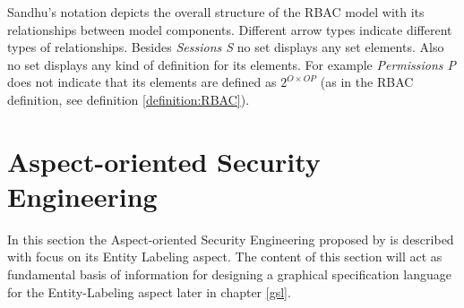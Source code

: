 \documentclass[twoside, openright, 12pt]{book}
\begin{document}
Sandhu's notation depicts the overall structure of the RBAC model with its relationships between model components.
Different arrow types indicate different types of relationships.
Besides \textit{Sessions S} no set displays any set elements.
Also no set displays any kind of definition for its elements.
For example \textit{Permissions P} does not indicate that its elements are defined as $2^{O \times OP}$ (as in the RBAC definition, see definition \ref{definition:RBAC}).








\section{Aspect-oriented Security Engineering}
\label{AOSE}
In this section the Aspect-oriented Security Engineering proposed by \cite{Amthor18} is described with focus on its Entity Labeling aspect.
The content of this section will act as fundamental basis of information for designing a graphical specification language for the Entity-Labeling aspect later in chapter \ref{gsl}.
\end{document}
